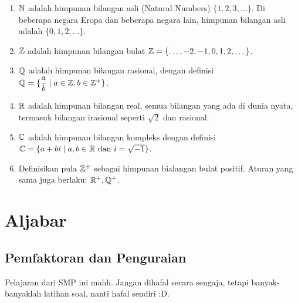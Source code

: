 	\begin{enumerate}
	\item $\mathbb N$ adalah himpunan bilangan asli (Natural Numbers) $\{1,2,3,\dots\}$. Di beberapa negara Eropa dan beberapa negara lain, himpunan bilangan asli adalah $\{0,1,2,\dots\}$.
	\item $\mathbb Z$ adalah himpunan bilangan bulat $\mathbb Z=\{\dots,-2,-1,0,1,2,\dots\}$.
	\item $\mathbb Q$ adalah himpunan bilangan rasional, dengan definisi $\mathbb Q=\{\dfrac{a}{b}\mid a\in \mathbb Z, b\in\mathbb Z^+\}$.
	\item $\mathbb R$ adalah himpunan bilangan real, semua bilangan yang ada di dunia nyata, termasuk bilangan irasional seperti $\sqrt{2}$ dan rasional.
	\item $\mathbb C$ adalah himpunan bilangan kompleks dengan definisi\\ $\mathbb C = \{a+bi \mid a,b \in \mathbb R \text{ dan }i=\sqrt{-1}\}$.
	\item Definisikan pula $\mathbb Z^+$ sebagai himpunan bialangan bulat positif. Aturan yang sama juga berlaku: $\mathbb R^+, \mathbb Q^+$.
	\end{enumerate}
	

	
	\section{Aljabar}
	\subsection{Pemfaktoran dan Penguraian}
	Pelajaran dari SMP ini mahh. Jangan dihafal secara sengaja, tetapi banyak-banyaklah latihan soal, nanti hafal sendiri :D.
	
